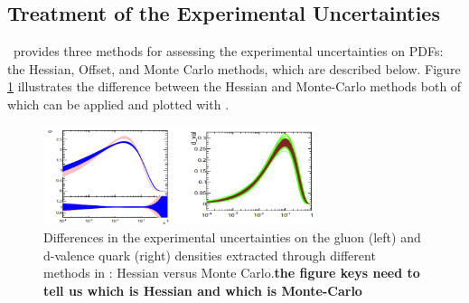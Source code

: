 \subsection{Treatment of the Experimental Uncertainties}

\fitter\ provides three methods for assessing the experimental uncertainties on PDFs: the Hessian, Offset, and Monte Carlo methods, which are described below.
Figure \ref{fig:error} illustrates the difference between the Hessian and Monte-Carlo methods both of which can be applied and plotted with \fitter.
\begin{figure}[!ht]
   \centering
   \includegraphics[width=8cm]{error.pdf}
   \caption{Differences in the experimental uncertainties on the gluon (left) and d-valence quark (right) densities extracted through different methods in \fitter: Hessian versus Monte Carlo.{\bf the figure keys need to tell us which is Hessian and which is Monte-Carlo}} 
 \label{fig:error}
\end{figure}
